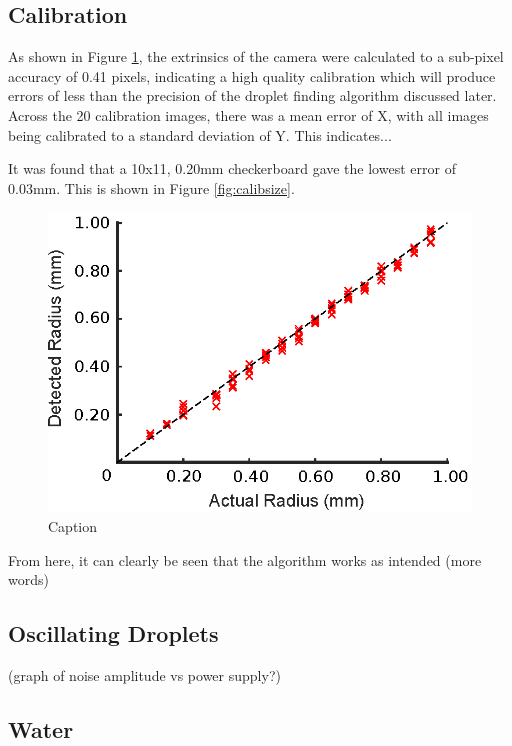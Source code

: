 \documentclass{physics_article_B}
\begin{document}
    \subsection{Calibration}
		As shown in Figure \ref{fig:calib:error}, the extrinsics of the camera were calculated to a sub-pixel accuracy of 0.41 pixels, indicating a high quality calibration which will produce errors of less than the precision of the droplet finding algorithm discussed later. Across the 20 calibration images, there was a mean error of X, with all images being calibrated to a standard deviation of Y. This indicates...
	        
	    It was found that a 10x11, 0.20mm checkerboard gave the lowest error of 0.03mm. This is shown in Figure \ref{fig:calibsize}. 
        
            \begin{figure}[H]
                \centering
                \hspace*{-1cm}\includegraphics{Figures/CameraCalib.eps}
                \caption{Caption}
                \label{fig:calib:error}
            \end{figure}
        
     	From here, it can clearly be seen that the algorithm works as intended (more words)

    \subsection{Oscillating Droplets}
    
      
    (graph of noise amplitude vs power supply?)
 
 	\subsection{Water}
 
\end{document}
